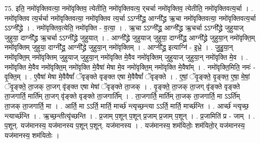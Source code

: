 \documentclass[17pt]{extarticle}
\begin{document}
75. इति॒ नमो॑वृक्तिवत्या॒ नमो॑वृक्तिव॒ त्येतीति॒ नमो॑वृक्तिवत्य॒ र्‌चर्चा नमो॑वृक्तिव॒ त्येतीति॒ नमो॑वृक्तिवत्य॒र्चा । . नमो॑वृक्तिव त्य॒र्चर्चा नमो॑वृक्तिवत्या॒ नमो॑वृक्तिव त्य॒र्चा ऽऽग्नी᳚द्ध्र॒ आग्नी᳚द्ध्र ऋ॒चा नमो॑वृक्तिवत्या॒ नमो॑वृक्तिवत्य॒र्चा ऽऽग्नी᳚द्ध्रे । . नमो॑वृक्तिव॒त्येति॒ नमो॑वृक्ति - व॒त्या॒ । . ऋ॒चा ऽऽग्नी᳚द्ध्र॒ आग्नी᳚द्ध्र ऋ॒चर्चा ऽऽग्नी᳚द्ध्रे जुहुयाज् जुहुया॒ दाग्नी᳚द्ध्र ऋ॒चर्चा ऽऽग्नी᳚द्ध्रे जुहुयात् । . आग्नी᳚द्ध्रे जुहुयाज् जुहुया॒ दाग्नी᳚द्ध्र॒ आग्नी᳚द्ध्रे जुहुया॒न् नमो॑वृक्ति॒म् नमो॑वृक्तिम् जुहुया॒ दाग्नी᳚द्ध्र॒ आग्नी᳚द्ध्रे जुहुया॒न् नमो॑वृक्तिम् । . आग्नी᳚द्ध्र॒ इत्याग्नि॑ - इ॒ध्रे॒ । . जु॒हु॒या॒न् नमो॑वृक्ति॒म् नमो॑वृक्तिम् जुहुयाज् जुहुया॒न् नमो॑वृक्ति मे॒वैव नमो॑वृक्तिम् जुहुयाज् जुहुया॒न् नमो॑वृक्ति मे॒व । . नमो॑वृक्ति मे॒वैव नमो॑वृक्ति॒म् नमो॑वृक्ति मे॒वैषा॑ मेषा मे॒व नमो॑वृक्ति॒म् नमो॑वृक्ति मे॒वैषा᳚म् । . नमो॑वृक्ति॒मिति॒ नमः॑ - वृ॒क्ति॒म् । . ए॒वैषा॑ मेषा मे॒वैवैषां᳚ ॅवृङ्क्ते वृङ्क्त एषा मे॒वैवैषां᳚ ॅवृङ्क्ते । . ए॒षां॒ ॅवृ॒ङ्क्ते॒ वृ॒ङ्क्त॒ ए॒षा॒ मे॒षां॒ ॅवृ॒ङ्क्ते॒ ता॒जक् ता॒जग् वृ॑ङ्क्त एषा मेषां ॅवृङ्क्ते ता॒जक् । . वृ॒ङ्क्ते॒ ता॒जक् ता॒जग् वृ॑ङ्क्ते वृङ्क्ते ता॒जगार्ति॒ मार्ति॑म् ता॒जग् वृ॑ङ्क्ते वृङ्क्ते ता॒जगार्ति᳚म् । . ता॒जगार्ति॒ मार्ति॑म् ता॒जक् ता॒जगार्ति॒ मा ऽऽर्ति॑म् ता॒जक् ता॒जगार्ति॒ मा । . आर्ति॒ मा ऽऽर्ति॒ मार्ति॒ मार्च्छ॑ न्त्यृच्छ॒न्त्या ऽऽर्ति॒ मार्ति॒ मार्च्छ॑न्ति । . आर्च्छ॑ न्त्यृच्छ॒ न्त्यार्च्छ॑न्ति । . ऋ॒च्छ॒न्तीत्यृ॑च्छन्ति । . प्र॒जाम् प॒शून् प॒शून् प्र॒जाम् प्र॒जाम् प॒शून् । . प्र॒जामिति॑ प्र - जाम् । . प॒शून्. यज॑मानस्य॒ यज॑मानस्य प॒शून् प॒शून्. यज॑मानस्य । . यज॑मानस्य॒ शम॑यितोः॒ शम॑यितो॒र् यज॑मानस्य॒ यज॑मानस्य॒ शम॑यितोः । \newline
\end{document}
